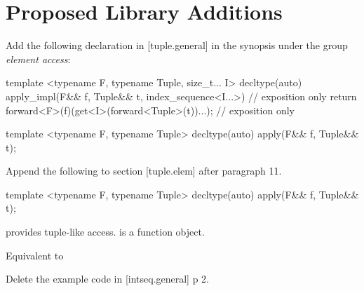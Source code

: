 \documentclass[ebook,11pt,article]{memoir}
\begin{document}
\chapter{Proposed Library Additions}

Add the following declaration in [tuple.general] in the synopsis under the group \emph{element access}:

\begin{codeblock}
template <typename F, typename Tuple, size_t... I>
decltype(auto) apply_impl(F&& f, Tuple&& t, index_sequence<I...>) // exposition only
{
	return forward<F>(f)(get<I>(forward<Tuple>(t))...); // exposition only
}

template <typename F, typename Tuple>
decltype(auto) apply(F&& f, Tuple&& t);
\end{codeblock}


Append the following to section [tuple.elem] after paragraph 11.

\begin{itemdecl}
template <typename F, typename Tuple>
decltype(auto) apply(F&& f, Tuple&& t);
\end{itemdecl}
\begin{itemdescr}
\pnum
\requires {} provides tuple-like access.  is a function object.

\pnum
\effects Equivalent to 
\end{itemdescr}

Delete the example code in [intseq.general] p 2.






\end{document}
